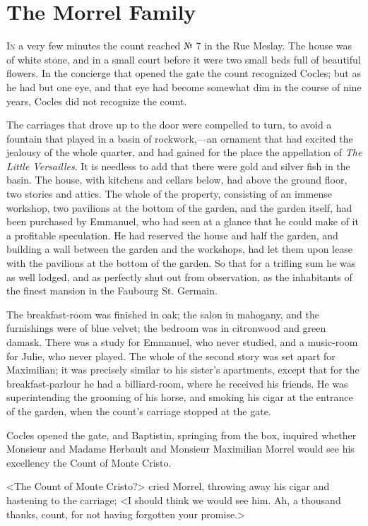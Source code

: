 \chapter{The Morrel Family} 

 \lettrine{I}{n} a very few minutes the count reached № 7 in the Rue Meslay. The house was of white stone, and in a small court before it were two small beds full of beautiful flowers. In the concierge that opened the gate the count recognized Cocles; but as he had but one eye, and that eye had become somewhat dim in the course of nine years, Cocles did not recognize the count. 

 The carriages that drove up to the door were compelled to turn, to avoid a fountain that played in a basin of rockwork,—an ornament that had excited the jealousy of the whole quarter, and had gained for the place the appellation of \textit{The Little Versailles}. It is needless to add that there were gold and silver fish in the basin. The house, with kitchens and cellars below, had above the ground floor, two stories and attics. The whole of the property, consisting of an immense workshop, two pavilions at the bottom of the garden, and the garden itself, had been purchased by Emmanuel, who had seen at a glance that he could make of it a profitable speculation. He had reserved the house and half the garden, and building a wall between the garden and the workshops, had let them upon lease with the pavilions at the bottom of the garden. So that for a trifling sum he was as well lodged, and as perfectly shut out from observation, as the inhabitants of the finest mansion in the Faubourg St. Germain. 

 The breakfast-room was finished in oak; the salon in mahogany, and the furnishings were of blue velvet; the bedroom was in citronwood and green damask. There was a study for Emmanuel, who never studied, and a music-room for Julie, who never played. The whole of the second story was set apart for Maximilian; it was precisely similar to his sister's apartments, except that for the breakfast-parlour he had a billiard-room, where he received his friends. He was superintending the grooming of his horse, and smoking his cigar at the entrance of the garden, when the count's carriage stopped at the gate. 

 Cocles opened the gate, and Baptistin, springing from the box, inquired whether Monsieur and Madame Herbault and Monsieur Maximilian Morrel would see his excellency the Count of Monte Cristo. 

 <The Count of Monte Cristo?> cried Morrel, throwing away his cigar and hastening to the carriage; <I should think we would see him. Ah, a thousand thanks, count, for not having forgotten your promise.> 

